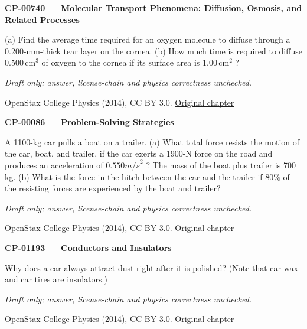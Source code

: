 \par\medskip
\noindent\textbf{CP-00740 — Molecular Transport Phenomena: Diffusion, Osmosis, and Related Processes}
\par (a) Find the average time required for an oxygen molecule to diffuse through a 0.200-mm-thick tear layer on the cornea. (b) How much time is required to diffuse $0.500\,{\mathrm{cm}}^{3}$ of oxygen to the cornea if its surface area is $1.00\,{\mathrm{cm}}^{2}$ ?
\par\smallskip
\textit{Draft only; answer, license-chain and physics correctness unchecked.}
\par{\footnotesize OpenStax College Physics (2014), CC BY 3.0. \href{https://github.com/philschatz/physics-book/blob/a7efaa7e221fab1694022d8bb98b83a73ee31d3d/contents/m42212.md}{Original chapter}}\par\normalsize

\par\medskip
\noindent\textbf{CP-00086 — Problem-Solving Strategies}
\par A 1100-kg car pulls a boat on a trailer. (a) What total force resists the motion of the car, boat, and trailer, if the car exerts a 1900-N force on the road and produces an acceleration of $0.{550 m/s}^{2}$ ? The mass of the boat plus trailer is 700 kg. (b) What is the force in the hitch between the car and the trailer if 80\% of the resisting forces are experienced by the boat and trailer?
\par\smallskip
\textit{Draft only; answer, license-chain and physics correctness unchecked.}
\par{\footnotesize OpenStax College Physics (2014), CC BY 3.0. \href{https://github.com/philschatz/physics-book/blob/a7efaa7e221fab1694022d8bb98b83a73ee31d3d/contents/m42076.md}{Original chapter}}\par\normalsize

\par\medskip
\noindent\textbf{CP-01193 — Conductors and Insulators}
\par Why does a car always attract dust right after it is polished? (Note that car wax and car tires are insulators.)
\par\smallskip
\textit{Draft only; answer, license-chain and physics correctness unchecked.}
\par{\footnotesize OpenStax College Physics (2014), CC BY 3.0. \href{https://github.com/philschatz/physics-book/blob/a7efaa7e221fab1694022d8bb98b83a73ee31d3d/contents/m42306.md}{Original chapter}}\par\normalsize

